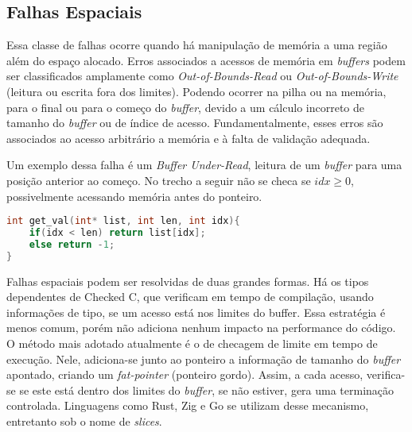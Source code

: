 
\subsection{Falhas Espaciais}

Essa classe de falhas ocorre quando há manipulação de memória a uma região 
além do espaço alocado. Erros associados a acessos de memória em \emph{buffers} 
podem ser classificados amplamente como \emph{Out-of-Bounds-Read} ou \emph{Out-of-Bounds-Write} 
(leitura ou escrita fora dos limites). 
Podendo ocorrer na pilha ou na memória, para o final ou para o começo do \emph{buffer}, 
devido a um cálculo incorreto de tamanho do \emph{buffer} ou de índice de acesso. 
Fundamentalmente, esses erros são associados ao acesso arbitrário a memória e 
à falta de validação adequada.

Um exemplo dessa falha é um \emph{Buffer Under-Read}, 
leitura de um \emph{buffer} para uma posição anterior ao começo. No trecho a seguir
não se checa se $idx \ge 0$, possivelmente acessando memória antes do ponteiro.

\begin{lstlisting}[language=C ,label={lst:spacial-error-c}, caption=Exemplo de uma Falha Espacial]
int get_val(int* list, int len, int idx){
	if(idx < len) return list[idx];
	else return -1;
}
\end{lstlisting}

Falhas espaciais podem ser resolvidas de duas grandes formas. Há os tipos dependentes de Checked C\cite{CHECKEDC}, que verificam em tempo de compilação, usando informações de tipo, se um acesso está nos limites do buffer. Essa estratégia é menos comum, porém não adiciona nenhum impacto na performance do código. 
O método mais adotado atualmente é o de checagem de limite em tempo de execução. Nele, adiciona-se junto ao ponteiro a informação de tamanho do \emph{buffer} apontado, criando um \emph{fat-pointer} (ponteiro gordo). Assim, a cada acesso, verifica-se se este está dentro dos limites do \emph{buffer}, se não estiver, gera uma terminação controlada. Linguagens como Rust, Zig e Go se utilizam desse mecanismo, entretanto sob o nome de \emph{slices}.


